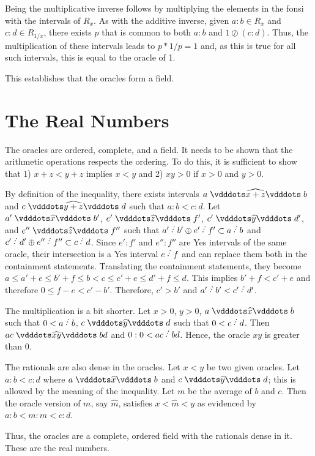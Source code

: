 \documentclass[12pt]{article}
\begin{document}
\begin{enumerate}
    Being the multiplicative inverse follows by multiplying the elements in the fonsi with the intervals of $R_x$. As with the additive inverse, given $a:b \in R_x$ and $c:d \in R_{1/x}$, there exists $p$ that is common to both $a:b$ and $1 \oslash (c:d)$. Thus, the multiplication of these intervals leads to $p *1/p = 1$ and, as this is true for all such intervals, this is equal to the oracle of 1. 

\end{enumerate}

This establishes that the oracles form a field. 


\section{The Real Numbers}

The oracles are ordered, complete, and a field. It needs to be shown that the arithmetic operations respects the ordering. To do this, it is sufficient to show that 1) $x + z < y +z$ implies $x<y$ and 2) $xy > 0 $ if $x >0 $ and $y >0$.

By definition of the inequality, there exists intervals $ a \xora[x+z] b$ and $c \xora[y + z] d$ such that $a:b < c:d$. Let $a' \xora b'$, $e' \xora[z] f'$, $c' \xora[y] d'$, and $e''  \xora[z] f''$ such that $a'\lte b'\oplus e' \lte f' \subset a \lte b$ and $c' \lte d' \oplus e'' \lte f'' \subset c \lte d$. Since $e':f'$ and $e'':f''$ are Yes intervals of the same oracle, their intersection is a Yes interval $e \lte f$ and can replace them both in the containment statements. Translating the containment statements, they become $a \leq a' + e \leq b' + f \leq b < c \leq c' + e \leq d' + f \leq d$. This implies $b' + f < c' + e$ and therefore $0 \leq f - e < c' -b'$. Therefore, $c' > b'$ and $a' \lte b' < c' \lte d'$.

The multiplication is a bit shorter. Let $x >0 $, $y >0$, $a \xora b$ such that $0<a \lte b$, $c \xora[y] d$ such that $0 < c \lte d$. Then $ac \xora[xy] bd$ and $0:0 < ac \lte bd$. Hence, the oracle $xy$ is greater than 0. 

The rationals are also dense in the oracles. Let $x < y$ be two given oracles. Let $a:b < c:d$ where $a \xora b$ and $c \xora[y] d$; this is allowed by the meaning of the inequality. Let $m$ be the average of $b$ and $c$. Then the oracle version of $m$, say $\widehat{m}$, satisfies $x < \widehat{m} < y$ as evidenced by $a:b < m:m < c:d$.

Thus, the oracles are a complete, ordered field with the rationals dense in it. These are the real numbers. 
\end{document}
